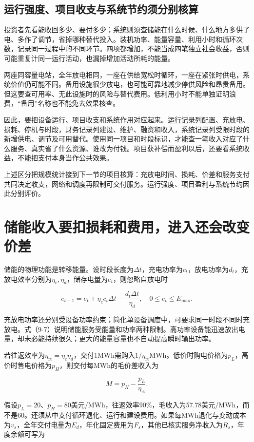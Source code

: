 \documentclass[UTF8,fontset=windows,12pt,a4paper,oneside,openany]{ctexbook}
\begin{document}
\subsection{运行强度、项目收支与系统节约须分别核算}

投资者先看能收回多少、要付多少；系统则须查储能在什么时候、什么地方多供了电、多作了调节，省掉哪种替代投入。装机功率、能量容量、利用小时和循环次数，记录同一过程中的不同环节。四项都增加，不能当成四笔独立社会收益，否则可能重复计同一运行活动，也漏掉增加活动所耗的能量。

两座同容量电站，全年放电相同，一座在供给宽松时循环，一座在紧张时供电，系统价值仍可能不同。备用设施很少放电，也可能可靠地减少停供风险和昂贵备用。但这要查可用率、无此设施时的风险与替代费用。低利用小时不能单独证明浪费，“备用”名称也不能免去效果核查。

因此，要把设备运行、项目收支和系统作用对应起来。运行记录列配置、充放电、损耗、停机与时段，财务记录列建设、维护、融资和收入，系统记录列受限时段的新增供电、调节及可用替代。使用同一项目和时段标识，才能查一笔收入对应了什么服务、真实省了什么资源、谁改为付钱。项目获补偿而盈利以后，还要看系统收益，不能把支付本身当作公共效果。

上述区分把规模统计接到下一节的项目核算：充放电时间、损耗、价差和服务支付共同决定收支，网络和调度再限制可交付服务。运行强度、项目盈利与系统节约因此分别评价。

\section{储能收入要扣损耗和费用，进入还会改变价差}

储能的物理功能是转移能量。设时段长度为\(\Delta t\)，充电功率为\(c_t\)，放电功率为\(d_t\)，充放电效率分别为\(\eta_c,\eta_d\)，储存电量为\(e_t\)，则忽略自放电时

\[
e_{t+1}=e_t+\eta_c c_t\Delta t-\frac{d_t\Delta t}{\eta_d},
\quad 0\leq e_t\leq E_{\max}.
\tag{9-7}
\]

充放电功率还分别受设备功率约束；简化单设备调度中，可要求同一时段不同时充放电。式（9-7）说明储能服务受能量和功率两种限制。高功率设备能迅速放出电量，却未必能持续很久；更大的能量容量也不自动提高瞬时输出功率。

若往返效率为\(\eta_{\mathrm{rt}}=\eta_c\eta_d\)，交付1MWh需购入\(1/\eta_{\mathrm{rt}}\)MWh。低价时购电价格为\(p_L\)，高价时售电价格为\(p_H\)，则交付每MWh的毛价差收入为

\[
M=p_H-\frac{p_L}{\eta_{\mathrm{rt}}}.
\tag{9-8}
\]

假设\(p_L=20\)、\(p_H=80\)美元/MWh，往返效率90\%，毛收入为57.78美元/MWh，而不是60。还须从中支付循环退化、运行和建设费用。如果每MWh退化与变动成本为\(v_s\)，全年交付电量为\(E_d\)，年化固定费用为\(F_s\)，其他已核实服务净收入为\(R_s\)，年度余额可写为
\end{document}
